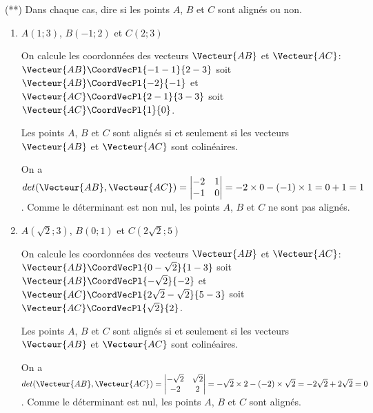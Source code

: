 \documentclass[a4paper]{article}
\begin{document}
    \begin{exercice}{(**)}{}
      Dans chaque cas, dire si les points $A$, $B$ et $C$ sont alignés ou non.
      \begin{enumerate}
        \item $A(1;3)$, $B(-1;2)$ et $C(2;3)$
        
        On calcule les coordonnées des vecteurs $\Vecteur{AB}$ et $\Vecteur{AC}$: $\Vecteur{AB}\CoordVecPl{-1-1}{2-3}$ soit $\Vecteur{AB}\CoordVecPl{-2}{-1}$ et $\Vecteur{AC}\CoordVecPl{2-1}{3-3}$ soit $\Vecteur{AC}\CoordVecPl{1}{0}$.

        Les points $A$, $B$ et $C$ sont alignés si et seulement si les vecteurs $\Vecteur{AB}$ et $\Vecteur{AC}$ sont colinéaires.

        On a $det(\Vecteur{AB}, \Vecteur{AC})=\begin{vmatrix}
          -2 & 1\\
          -1 & 0
        \end{vmatrix}=-2\times 0-(-1)\times 1=0+1=1$. Comme le déterminant est non nul, les points $A$, $B$ et $C$ ne sont pas alignés.

        \item $A(\sqrt{2};3)$, $B(0;1)$ et $C(2\sqrt{2};5)$
        
        On calcule les coordonnées des vecteurs $\Vecteur{AB}$ et $\Vecteur{AC}$: $\Vecteur{AB}\CoordVecPl{0-\sqrt{2}}{1-3}$ soit $\Vecteur{AB}\CoordVecPl{-\sqrt{2}}{-2}$ et $\Vecteur{AC}\CoordVecPl{2\sqrt{2}-\sqrt{2}}{5-3}$ soit $\Vecteur{AC}\CoordVecPl{\sqrt{2}}{2}$.

        Les points $A$, $B$ et $C$ sont alignés si et seulement si les vecteurs $\Vecteur{AB}$ et $\Vecteur{AC}$ sont colinéaires.

        On a $det(\Vecteur{AB}, \Vecteur{AC})=\begin{vmatrix}
          -\sqrt{2} & \sqrt{2}\\
          -2 & 2
        \end{vmatrix}=-\sqrt{2}\times 2-(-2)\times \sqrt{2}=-2\sqrt{2}+2\sqrt{2}=0$. Comme le déterminant est nul, les points $A$, $B$ et $C$ sont alignés.
         
      \end{enumerate}
      \end{exercice}
\end{document}
